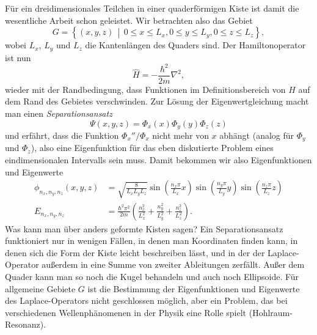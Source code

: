 Für ein dreidimensionales Teilchen in einer quaderförmigen Kiste ist damit die
wesentliche Arbeit schon geleistet. Wir betrachten also das Gebiet
\begin{equation}
	G = \left\{(x,y,z)\,\middle| \,  0\le x \le L_x, 0\le y \le L_y, 0\le z \le L_z  \right\},
\end{equation}
wobei $L_x$, $L_y$ und $L_z$ die Kantenlängen des Quaders sind. Der Hamiltonoperator ist
nun 
\begin{equation}
	\widehat{H} = -\frac{\hbar^2}{2m}\nabla^2,
\end{equation}
wieder mit der Randbedingung, dass Funktionen im Definitionsbereich von $H$ auf dem Rand des Gebietes verschwinden. Zur Lösung der Eigenwertgleichung macht man einen \emph{Separationsansatz}
\begin{equation}
	\Psi(x,y,z) = \Phi_x(x)\Phi_y(y)\Phi_z(z)
\end{equation}
und erfährt, dass die Funktion $\Phi_x''/\Phi_x$ nicht mehr von $x$ abhängt (analog für $\Phi_y$ und $\Phi_z$), also eine Eigenfunktion für das eben diskutierte Problem eines eindimensionalen Intervalls sein muss. Damit bekommen wir also Eigenfunktionen und Eigenwerte
\begin{align}
	\phi_{n_x,n_y,n_z}(x,y,z) &= \sqrt{\frac{8}{L_xL_yL_z}} \sin\left(\frac{n_x\pi}{L_x} x\right)\sin\left(\frac{n_y\pi}{L_y} y\right)\sin\left(\frac{n_z\pi}{L_z} z\right) \\
	E_{n_x,n_y,n_z}&=\frac{\hbar^2\pi^2}{2m} \left(\frac{n_x^2}{L_x^2} + \frac{n_y^2}{L_y^2} + \frac{n_z^2}{L_z^2} \right).
\end{align}
Was kann man über anders geformte Kisten sagen? Ein Separationsansatz funktioniert nur in wenigen Fällen, in denen man Koordinaten finden kann, in denen sich die Form der Kiste leicht beschreiben lässt, und in der der
Laplace-Operator außerdem in eine Summe von zweiter Ableitungen zerfällt. Außer dem Quader kann man so noch die Kugel behandeln und auch noch Ellipsoide. Für allgemeine Gebiete $G$ ist die Bestimmung der Eigenfunktionen
und Eigenwerte des Laplace-Operators nicht geschlossen möglich, aber ein Problem, das bei verschiedenen Wellenphänomenen in der Physik eine Rolle spielt (Hohlraum-Resonanz).